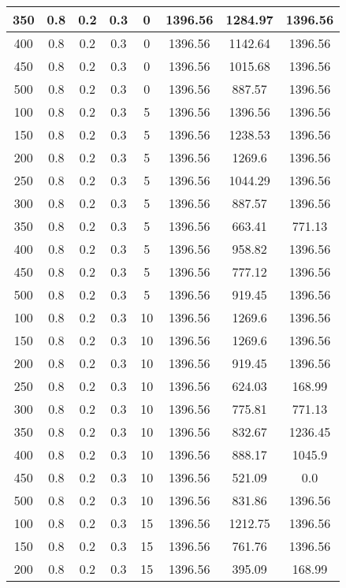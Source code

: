\documentclass[a4paper, 12pt]{extreport}
\begin{document}
\begin{itemize}
\begin{longtable}{|c|c|c|c|c|c|c|c|}
			350 & 0.8 & 0.2 & 0.3 & 0 & 1396.56 & 1284.97 & 1396.56 \\\hline
			400 & 0.8 & 0.2 & 0.3 & 0 & 1396.56 & 1142.64 & 1396.56 \\\hline
			450 & 0.8 & 0.2 & 0.3 & 0 & 1396.56 & 1015.68 & 1396.56 \\\hline
			500 & 0.8 & 0.2 & 0.3 & 0 & 1396.56 & 887.57 & 1396.56 \\\hline
			100 & 0.8 & 0.2 & 0.3 & 5 & 1396.56 & 1396.56 & 1396.56 \\\hline
			150 & 0.8 & 0.2 & 0.3 & 5 & 1396.56 & 1238.53 & 1396.56 \\\hline
			200 & 0.8 & 0.2 & 0.3 & 5 & 1396.56 & 1269.6 & 1396.56 \\\hline
			250 & 0.8 & 0.2 & 0.3 & 5 & 1396.56 & 1044.29 & 1396.56 \\\hline
			300 & 0.8 & 0.2 & 0.3 & 5 & 1396.56 & 887.57 & 1396.56 \\\hline
			350 & 0.8 & 0.2 & 0.3 & 5 & 1396.56 & 663.41 & 771.13 \\\hline
			400 & 0.8 & 0.2 & 0.3 & 5 & 1396.56 & 958.82 & 1396.56 \\\hline
			450 & 0.8 & 0.2 & 0.3 & 5 & 1396.56 & 777.12 & 1396.56 \\\hline
			500 & 0.8 & 0.2 & 0.3 & 5 & 1396.56 & 919.45 & 1396.56 \\\hline
			100 & 0.8 & 0.2 & 0.3 & 10 & 1396.56 & 1269.6 & 1396.56 \\\hline
			150 & 0.8 & 0.2 & 0.3 & 10 & 1396.56 & 1269.6 & 1396.56 \\\hline
			200 & 0.8 & 0.2 & 0.3 & 10 & 1396.56 & 919.45 & 1396.56 \\\hline
			250 & 0.8 & 0.2 & 0.3 & 10 & 1396.56 & 624.03 & 168.99 \\\hline
			300 & 0.8 & 0.2 & 0.3 & 10 & 1396.56 & 775.81 & 771.13 \\\hline
			350 & 0.8 & 0.2 & 0.3 & 10 & 1396.56 & 832.67 & 1236.45 \\\hline
			400 & 0.8 & 0.2 & 0.3 & 10 & 1396.56 & 888.17 & 1045.9 \\\hline
			450 & 0.8 & 0.2 & 0.3 & 10 & 1396.56 & 521.09 & 0.0 \\\hline
			500 & 0.8 & 0.2 & 0.3 & 10 & 1396.56 & 831.86 & 1396.56 \\\hline
			100 & 0.8 & 0.2 & 0.3 & 15 & 1396.56 & 1212.75 & 1396.56 \\\hline
			150 & 0.8 & 0.2 & 0.3 & 15 & 1396.56 & 761.76 & 1396.56 \\\hline
			200 & 0.8 & 0.2 & 0.3 & 15 & 1396.56 & 395.09 & 168.99 \\\hline

\end{longtable}
\end{itemize}
\end{document}
